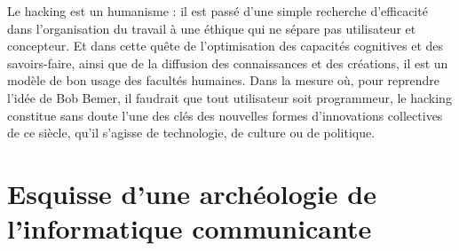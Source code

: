 \documentclass{FramateX}
\begin{document}
\begin{refsection}
Le hacking est un humanisme : il est passé d'une simple recherche
d'efficacité dans l'organisation du travail à une éthique qui ne sépare
pas utilisateur et concepteur. Et dans cette quête de
l'optimisation des capacités cognitives et des
savoirs-faire, ainsi que de la diffusion des connaissances et des
créations, il est un modèle de bon usage des facultés humaines. Dans la
mesure où, pour reprendre l'idée de Bob Bemer, il faudrait que tout
utilisateur soit programmeur, le hacking constitue sans doute l'une des
clés des nouvelles formes d'innovations collectives de ce siècle, qu'il
s'agisse de technologie, de culture ou de politique.





\printbibliography[heading=subbibliography]
\end{refsection}






\chapter*{Esquisse d'une archéologie de l'informatique communicante} 
{}
\end{document}
